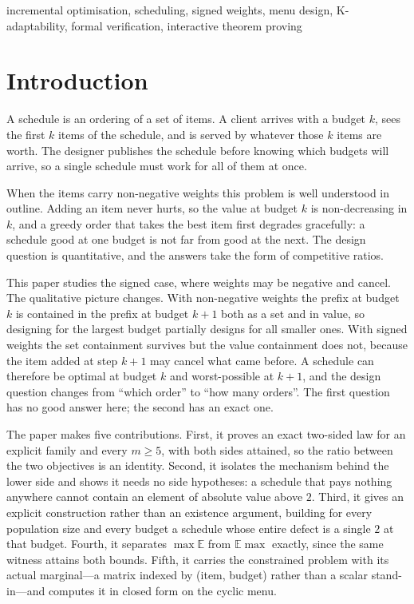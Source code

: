 \documentclass[conference]{IEEEtran}
\theoremstyle{definition}
\begin{document}
\begin{IEEEkeywords}
incremental optimisation, scheduling, signed weights, menu design, K-adaptability,
formal verification, interactive theorem proving
\end{IEEEkeywords}

\section{Introduction}

A schedule is an ordering of a set of items. A client arrives with a budget $k$, sees the
first $k$ items of the schedule, and is served by whatever those $k$ items are worth. The
designer publishes the schedule before knowing which budgets will arrive, so a single
schedule must work for all of them at once.

When the items carry non-negative weights this problem is well understood in outline. Adding
an item never hurts, so the value at budget $k$ is non-decreasing in $k$, and a greedy order
that takes the best item first degrades gracefully: a schedule good at one budget is not far
from good at the next. The design question is quantitative, and the answers take the form of
competitive ratios.

This paper studies the signed case, where weights may be negative and cancel. The qualitative
picture changes. With non-negative weights the prefix at budget $k$ is contained in the
prefix at budget $k+1$ both as a set and in value, so designing for the largest budget
partially designs for all smaller ones. With signed weights the set containment survives but
the value containment does not, because the item added at step $k+1$ may cancel what came
before. A schedule can therefore be optimal at budget $k$ and worst-possible at $k+1$, and
the design question changes from ``which order'' to ``how many orders''. The first question
has no good answer here; the second has an exact one.

The paper makes five contributions. First, it proves an exact two-sided law for an explicit
family and every $m\ge5$, with both sides attained, so the ratio between the two objectives
is an identity. Second, it isolates the mechanism behind the lower side and shows it needs no
side hypotheses: a schedule that pays nothing anywhere cannot contain an element of absolute
value above $2$. Third, it gives an explicit construction rather than an existence argument,
building for every population size and every budget a schedule whose entire defect is a
single $2$ at that budget. Fourth, it separates $\max\mathbb{E}$ from $\mathbb{E}\max$
exactly, since the same witness attains both bounds. Fifth, it carries the constrained
problem with its actual marginal---a matrix indexed by (item, budget) rather than a scalar
stand-in---and computes it in closed form on the cyclic menu.
\end{document}
